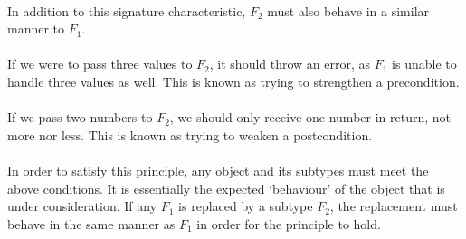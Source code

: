 \documentclass{article}
\begin{document}
\\
In addition to this signature characteristic, $F_2$ must also behave in a similar manner to $F_1$. \\
\\
If we were to pass three values to $F_2$, it should throw an error, as $F_1$ is unable to handle three values as well. This is known as trying to strengthen a precondition. \\
\\
If we pass two numbers to $F_2$, we should only receive one number in return, not more nor less. This is known as trying to weaken a postcondition. \\
\\
In order to satisfy this principle, any object and its subtypes must meet the above conditions. It is essentially the expected ‘behaviour’ of the object that is under consideration. If any $F_1$ is replaced by a subtype $F_2$, the replacement must behave in the same manner as $F_1$ in order for the principle to hold.
\end{document}
